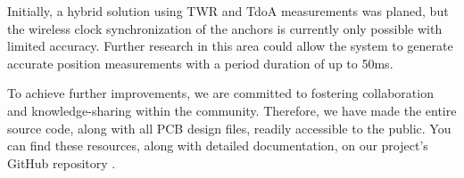 \documentclass[10pt,a4paper,twocolumn]{article}
\begin{document}
Initially, a hybrid solution using \ac{TWR} and \ac{TdoA} measurements was planed,
but the wireless clock synchronization of the anchors is currently only possible with limited accuracy.
Further research in this area could allow the system to generate accurate position measurements with a period duration of up to 50ms.

To achieve further improvements, we are committed to fostering collaboration and knowledge-sharing
within the community.
Therefore, we have made the entire source code, along with all PCB design files,
readily accessible to the public.
You can find these resources, along with detailed documentation,
on our project's GitHub repository \cite{uwb-tracking}.




\end{document}
